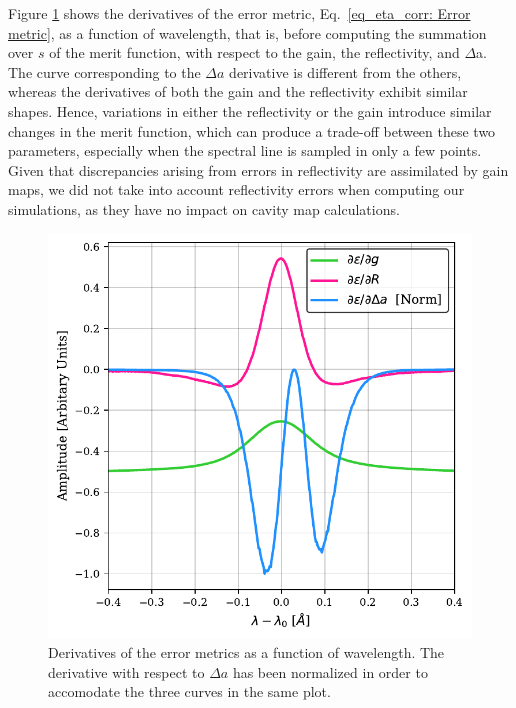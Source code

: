 Figure \ref{fig_etalon_corr: Derivatives} shows the derivatives of the error metric, Eq.~\eqref{eq_eta_corr: Error metric}, as a function of wavelength, that is, before computing the summation over $s$ of the merit function, with respect to the gain, the reflectivity, and $\Delta $a. The curve corresponding to the $\Delta a$ derivative is different from the others, whereas the derivatives of both the gain and the reflectivity exhibit similar shapes. Hence, variations in either the reflectivity or the gain introduce similar changes in the merit function, which can produce a trade-off between these two parameters, especially when the spectral line is sampled in only a few points. Given that discrepancies arising from errors in reflectivity are assimilated by gain maps, we did not take into account reflectivity errors when computing our simulations, as they have no impact on cavity map calculations.

\begin{figure}
  \begin{minipage}[c]{0.6\textwidth}
    \includegraphics[width=\textwidth]{figures/EtalonPaper/Derivadas.pdf}
  \end{minipage}\hfill
  \begin{minipage}[c]{0.37\textwidth}
    \caption[Derivatives of metrit function]{
      Derivatives of the error metrics as a function of wavelength. The derivative with respect to $\Delta a$ has been normalized in order to accomodate the three curves in the same plot. \label{fig_etalon_corr: Derivatives}} 
  \end{minipage}
\end{figure}


